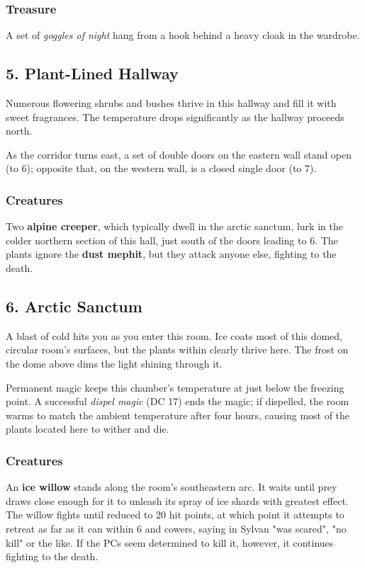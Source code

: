 \documentclass[10pt,a4paper,twoside,bg=print,twocolumn,openany,nodeprecatedcode]{dndbook}
\begin{document}
\subsubsection{Treasure}
A set of \textit{goggles of night} hang from a hook behind a heavy cloak in the wardrobe.

\subsection{5. Plant-Lined Hallway}
\begin{DndReadAloud}{}
Numerous flowering shrubs and bushes thrive in this hallway and fill it with sweet fragrances. The temperature drops significantly as the hallway proceeds north.

\end{DndReadAloud}

As the corridor turns east, a set of double doors on the eastern wall stand open (to 6); opposite that, on the western wall, is a closed single door (to 7).

\subsubsection{Creatures}
Two \textbf{alpine creeper}, which typically dwell in the arctic sanctum, lurk in the colder northern section of this hall, just south of the doors leading to 6. The plants ignore the \textbf{dust mephit}, but they attack anyone else, fighting to the death.

\subsection{6. Arctic Sanctum}
\begin{DndReadAloud}{}
A blast of cold hits you as you enter this room. Ice coats most of this domed, circular room's surfaces, but the plants within clearly thrive here. The frost on the dome above dims the light shining through it.

\end{DndReadAloud}

Permanent magic keeps this chamber's temperature at just below the freezing point. A successful \textit{dispel magic} (DC 17) ends the magic; if dispelled, the room warms to match the ambient temperature after four hours, causing most of the plants located here to wither and die.

\subsubsection{Creatures}
An \textbf{ice willow} stands along the room's southeastern arc. It waits until prey draws close enough for it to unleash its spray of ice shards with greatest effect. The willow fights until reduced to 20 hit points, at which point it attempts to retreat as far as it can within 6 and cowers, saying in Sylvan "was scared", "no kill" or the like. If the PCs seem determined to kill it, however, it continues fighting to the death.
\end{document}
